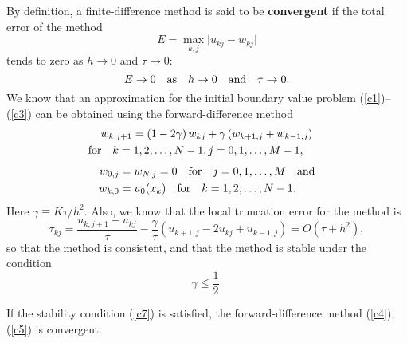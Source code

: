     
By definition, a finite-difference method is said to be {\bf convergent}
if the total error of the method
\[
E=\max\limits_{k,j}\vert u_{kj}-w_{kj}\vert
\]
tends to zero as $h\to 0$ and $\tau\to 0$:
\[
E \to 0 \quad {\rm as} \quad h\to 0 \quad {\rm and} \quad \tau\to 0.
\]
We know that an approximation for the initial boundary value problem (\ref{c1})--(\ref{c3})
can be obtained using the forward-difference method
\begin{multline}
w_{k,j+1}=\left(1-2\gamma\right)w_{kj}+
\gamma\left( w_{k+1, j}+w_{k-1,j}\right)\\ {\rm for}
\quad k=1,2,\dots,N-1, 
j=0,1,\dots,M-1, \quad\quad \label{c4}
\end{multline}
\begin{align}
w_{0,j}&=w_{N,j}=0  \quad {\rm for}
\quad j=0,1,\dots,M \quad {\rm and} \\w_{k,0}&=u_{0}(x_{k}) \quad {\rm for}
\quad k=1,2,\dots,N-1. \label{c5}
\end{align}
Here $\gamma\equiv K\tau/h^{2}$.
Also, we know that the local truncation error for the method is
\begin{equation}
\tau_{kj}= \frac{u_{k,j+1}-u_{kj}}{\tau}-\frac{\gamma}{\tau}
\left(u_{k+1,j}-2u_{kj}+u_{k-1,j}\right)=O(\tau+h^{2}), \label{c6}
\end{equation}
so that the method is consistent,
and that the method is stable under the condition
\begin{equation}
\gamma \leq \frac{1}{2}. \label{c7}
\end{equation}
\begin{theorem}
If the stability condition (\ref{c7}) is satisfied,  the forward-difference method 
(\ref{c4}), (\ref{c5}) is convergent.
\end{theorem}

